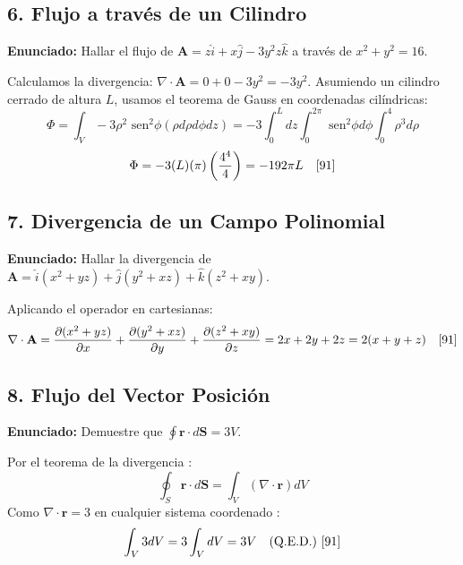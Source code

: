 \documentclass[a4paper]{article}
\begin{document}
\subsection*{6. Flujo a través de un Cilindro}
\textbf{Enunciado:} Hallar el flujo de $\mathbf{A} = z\hat{i} + x\hat{j} - 3y^2z\hat{k}$ a través de $x^2 + y^2 = 16$.

Calculamos la divergencia: $\nabla \cdot \mathbf{A} = 0 + 0 - 3y^2 = -3y^2$.
Asumiendo un cilindro cerrado de altura $L$, usamos el teorema de Gauss en coordenadas cilíndricas:
\begin{equation*}
    \Phi = \int_V -3\rho^2 \text{ sen}^2\phi (\rho d\rho d\phi dz) = -3 \int_0^L dz \int_0^{2\pi} \text{ sen}^2\phi d\phi \int_0^4 \rho^3 d\rho
\end{equation*}
\begin{equation*}
    \Phi = -3 (L) (\pi) \left( \frac{4^4}{4} \right) = -192\pi L \quad \text{\cite{91}}
\end{equation*}

\subsection*{7. Divergencia de un Campo Polinomial}
\textbf{Enunciado:} Hallar la divergencia de $\mathbf{A} = \hat{i}(x^2 + yz) + \hat{j}(y^2 + xz) + \hat{k}(z^2 + xy)$.

Aplicando el operador en cartesianas:
\begin{equation*}
    \nabla \cdot \mathbf{A} = \frac{\partial(x^2 + yz)}{\partial x} + \frac{\partial(y^2 + xz)}{\partial y} + \frac{\partial(z^2 + xy)}{\partial z} = 2x + 2y + 2z = 2(x+y+z) \quad \text{\cite{91}}
\end{equation*}

\subsection*{8. Flujo del Vector Posición}
\textbf{Enunciado:} Demuestre que $\oint \mathbf{r} \cdot d\mathbf{S} = 3V$.

Por el teorema de la divergencia \cite{89}:
\begin{equation*}
    \oint_S \mathbf{r} \cdot d\mathbf{S} = \int_V (\nabla \cdot \mathbf{r}) dV
\end{equation*}
Como $\nabla \cdot \mathbf{r} = 3$ en cualquier sistema coordenado \cite{109}:
\begin{equation*}
    \int_V 3 dV = 3 \int_V dV = 3V \quad \text{(Q.E.D.) \cite{91}}
\end{equation*}
\end{document}
